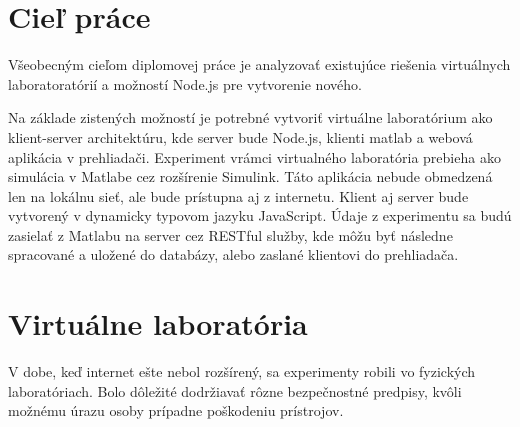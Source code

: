 
\section{Cieľ práce}
Všeobecným cieľom diplomovej práce je analyzovať existujúce riešenia virtuálnych laboratoratórií a možností Node.js pre vytvorenie nového.

Na základe zistených možností je potrebné vytvoriť virtuálne laboratórium ako klient-server architektúru, kde server bude Node.js, klienti matlab a webová aplikácia v prehliadači. Experiment vrámci virtualného laboratória prebieha ako simulácia v Matlabe cez rozšírenie Simulink. Táto aplikácia nebude obmedzená len na lokálnu sieť, ale bude prístupna aj z internetu. Klient aj server bude vytvorený v dynamicky typovom jazyku JavaScript. Údaje z experimentu sa budú zasielať z Matlabu na server cez RESTful služby, kde môžu byť následne spracované a uložené do databázy, alebo zaslané klientovi do prehliadača.


\section{Virtuálne laboratória}
\indent V dobe, keď internet ešte nebol rozšírený, sa experimenty robili vo fyzických laboratóriach. Bolo dôležité dodržiavať rôzne bezpečnostné predpisy, kvôli možnému úrazu osoby prípadne poškodeniu prístrojov.

